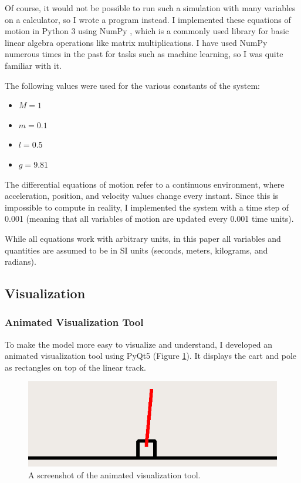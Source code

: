\documentclass[11pt]{article}
\begin{document}
Of course, it would not be possible to run such a simulation with many variables on a calculator, so I wrote a program instead. I implemented these equations of motion in Python 3 using NumPy \cite{numpy}, which is a commonly used library for basic linear algebra operations like matrix multiplications. I have used NumPy numerous times in the past for tasks such as machine learning, so I was quite familiar with it.

The following values were used for the various constants of the system:

\begin{itemize}
    \item $M = 1$
    \item $m = 0.1$
    \item $l = 0.5$
    \item $g = 9.81$
\end{itemize}

The differential equations of motion refer to a continuous environment, where acceleration, position, and velocity values change every instant. Since this is impossible to compute in reality, I implemented the system with a time step of 0.001 (meaning that all variables of motion are updated every 0.001 time units).

While all equations work with arbitrary units, in this paper all variables and quantities are assumed to be in SI units (seconds, meters, kilograms, and radians).

\subsection{Visualization}

\subsubsection{Animated Visualization Tool}

To make the model more easy to visualize and understand, I developed an animated visualization tool using PyQt5 (Figure \ref{simulation}). It displays the cart and pole as rectangles on top of the linear track.

\begin{figure}[ht]
    \centering
    \includegraphics[width=\textwidth]{simulation}
    \caption{\label{simulation} A screenshot of the animated visualization tool.}
\end{figure}
\end{document}
